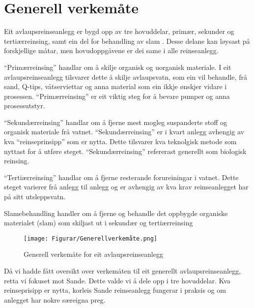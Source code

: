 \section{Generell verkemåte}

Eit avlaupsreinseanlegg er bygd opp av tre hovuddelar, primær, sekunder og tertiærreinsing,
samt ein del for behandling av slam \citep{Regjeriga}.
Desse delane kan løysast på forskjellige måtar, men hovudoppgåvene er dei same
i alle reinseanlegg.

``Primærreinsing'' handlar om å skilje organisk og uorganisk materiale.
I eit avlaupsreinseanlegg tilsvarer dette å skilje avlaupsvatn, 
som ein vil behandle, frå sand, Q-tips, våtserviettar og anna material som ein ikkje ønskjer vidare i prosessen.\newline
``Primærreinsing'' er eit viktig steg for å bevare pumper og anna prosessutstyr.

``Sekundærreinsing'' handlar om å fjerne mest mogleg suspanderte stoff og organisk materiale frå vatnet.
``Sekundærreinsing'' er i kvart anlegg avhengig av kva ``reinseprinsipp'' som er nytta. 
Dette tilsvarer kva teknolgisk metode som nyttast for å utføre steget.
``Sekundærreinsing'' refererast generellt som biologisk reinsing.

``Tertiærreinsing'' handlar om å fjerne resterande forureiningar i vatnet.
Dette steget varierer frå anlegg til anlegg og er
avhengig av kva krav reinseanlegget har på sitt utsleppsvatn.

Slamebehandling handler om å fjerne og behandle det oppbygde organiske materialet (slam)
som skiljast ut i sekundær og tertiærreinsing 

\begin{figure}[htbp]
    \centering
    \texttt{[image: Figurar/Generellverkemåte.png]}
    \caption{Generell verkemåte for eit avlaupsreinseanlegg}\label{fig:GenerellVerkemåte}
\end{figure}

Då vi hadde fått oversikt over verkemåten til eit generellt avlaupsreinseanlegg, retta vi fokuset mot Sande.
Dette valde vi å dele opp i tre hovuddelar. Kva reinseprisipp er nytta, korleis Sande reinseanlegg
fungerar i praksis og om anlegget har nokre særeigna preg.
